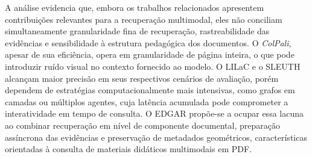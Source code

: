 \begin{table}[htbp]
\centering
\caption{Análise comparativa dos trabalhos relacionados e o presente trabalho.}
\label{tab:comparativo_trabalhos}
\end{table}

A análise evidencia que, embora os trabalhos relacionados apresentem contribuições relevantes para a recuperação multimodal, eles não conciliam simultaneamente granularidade fina de recuperação, rastreabilidade das evidências e sensibilidade à estrutura pedagógica dos documentos. O \textit{ColPali}, apesar de sua eficiência, opera em granularidade de página inteira, o que pode introduzir ruído visual no contexto fornecido ao modelo. O LILaC e o SLEUTH alcançam maior precisão em seus respectivos cenários de avaliação, porém dependem de estratégias computacionalmente mais intensivas, como grafos em camadas ou múltiplos agentes, cuja latência acumulada pode comprometer a interatividade em tempo de consulta. O EDGAR propõe-se a ocupar essa lacuna ao combinar recuperação em nível de componente documental, preparação assíncrona das evidências e preservação de metadados geométricos, características orientadas à consulta de materiais didáticos multimodais em PDF.